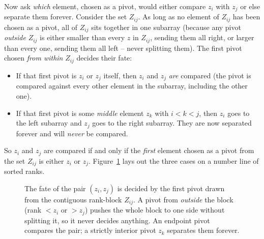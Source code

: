 Now ask \emph{which} element, chosen as a pivot, would either compare
$z_i$ with $z_j$ or else separate them forever. Consider the set $Z_{ij}$. As
long as no element of $Z_{ij}$ has been chosen as a pivot, all of $Z_{ij}$ sits
together in one subarray (because any pivot \emph{outside} $Z_{ij}$ is either
smaller than every $z$ in $Z_{ij}$, sending them all right, or larger than every
one, sending them all left -- never splitting them). The first pivot chosen
\emph{from within} $Z_{ij}$ decides their fate:
\begin{itemize}
\item If that first pivot is $z_i$ or $z_j$ itself, then $z_i$ and $z_j$
\emph{are} compared (the pivot is compared against every other element in the
subarray, including the other one).
\item If that first pivot is some \emph{middle} element $z_k$ with $i < k < j$,
then $z_i$ goes to the left subarray and $z_j$ goes to the right subarray. They
are now separated forever and will \emph{never} be compared.
\end{itemize}

So $z_i$ and $z_j$ are compared if and only if the \emph{first} element chosen as
a pivot from the set $Z_{ij}$ is either $z_i$ or $z_j$.
Figure~\ref{ch07:zij} lays out the three cases on a number line of sorted ranks.

\begin{figure}[h]
\centering
{}
\caption{The fate of the pair $(z_i, z_j)$ is decided by the first pivot drawn
from the contiguous rank-block $Z_{ij}$. A pivot from \emph{outside} the block
(rank $<z_i$ or $>z_j$) pushes the whole block to one side without splitting it,
so it never decides anything. An endpoint pivot compares the pair; a strictly
interior pivot $z_k$ separates them forever.}
\label{ch07:zij}
\end{figure}

